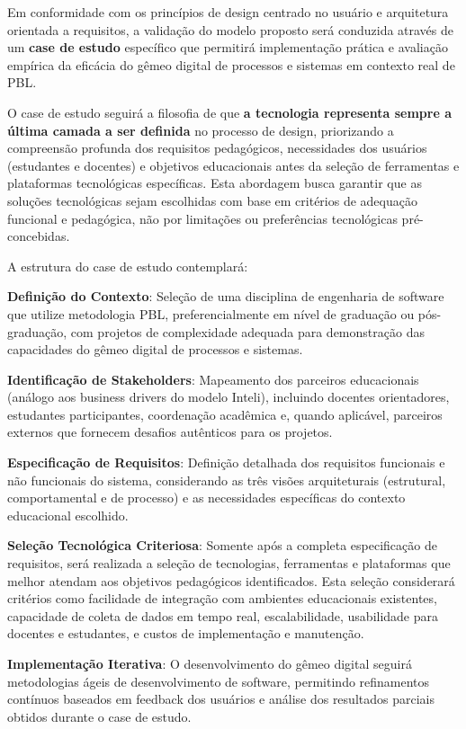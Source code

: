 \documentclass[12pt, a4paper, oneside]{abntex2}
\begin{document}
Em conformidade com os princípios de design centrado no usuário e arquitetura orientada a requisitos, a validação do modelo proposto será conduzida através de um \textbf{case de estudo} específico que permitirá implementação prática e avaliação empírica da eficácia do gêmeo digital de processos e sistemas em contexto real de PBL.

O case de estudo seguirá a filosofia de que \textbf{a tecnologia representa sempre a última camada a ser definida} no processo de design, priorizando a compreensão profunda dos requisitos pedagógicos, necessidades dos usuários (estudantes e docentes) e objetivos educacionais antes da seleção de ferramentas e plataformas tecnológicas específicas. Esta abordagem busca garantir que as soluções tecnológicas sejam escolhidas com base em critérios de adequação funcional e pedagógica, não por limitações ou preferências tecnológicas pré-concebidas.

A estrutura do case de estudo contemplará:

\textbf{Definição do Contexto}: Seleção de uma disciplina de engenharia de software que utilize metodologia PBL, preferencialmente em nível de graduação ou pós-graduação, com projetos de complexidade adequada para demonstração das capacidades do gêmeo digital de processos e sistemas.

\textbf{Identificação de Stakeholders}: Mapeamento dos parceiros educacionais (análogo aos business drivers do modelo Inteli), incluindo docentes orientadores, estudantes participantes, coordenação acadêmica e, quando aplicável, parceiros externos que fornecem desafios autênticos para os projetos.

\textbf{Especificação de Requisitos}: Definição detalhada dos requisitos funcionais e não funcionais do sistema, considerando as três visões arquiteturais (estrutural, comportamental e de processo) e as necessidades específicas do contexto educacional escolhido.

\textbf{Seleção Tecnológica Criteriosa}: Somente após a completa especificação de requisitos, será realizada a seleção de tecnologias, ferramentas e plataformas que melhor atendam aos objetivos pedagógicos identificados. Esta seleção considerará critérios como facilidade de integração com ambientes educacionais existentes, capacidade de coleta de dados em tempo real, escalabilidade, usabilidade para docentes e estudantes, e custos de implementação e manutenção.

\textbf{Implementação Iterativa}: O desenvolvimento do gêmeo digital seguirá metodologias ágeis de desenvolvimento de software, permitindo refinamentos contínuos baseados em feedback dos usuários e análise dos resultados parciais obtidos durante o case de estudo.
\end{document}
